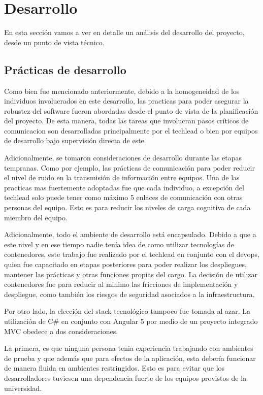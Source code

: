 \section{Desarrollo}

En esta sección vamos a ver en detalle un análisis del desarrollo del proyecto, desde un punto de vista técnico.

\subsection{Prácticas de desarrollo}

Como bien fue mencionado anteriormente, debido a la homogeneidad de los individuos involucrados en este desarrollo, las practicas para poder asegurar la robustez del software fueron abordadas desde el punto de vista de la planificación del proyecto. De esta manera, todas las tareas que involucran pasos críticos de comunicacion son desarrolladas principalmente por el techlead o bien por equipos de desarrollo bajo supervisión directa de este.

Adicionalmente, se tomaron consideraciones de desarrollo durante las etapas tempranas. Como por ejemplo, las prácticas de comunicación para poder reducir el nivel de ruido en la transmisión de información entre equipos. Una de las practicas mas fuertemente adoptadas fue que cada individuo, a excepción del techlead solo puede tener como máximo 5 enlaces de comunicación con otras personas del equipo. Esto es para reducir los niveles de carga cognitiva de cada miembro del equipo.

Adicionalmente, todo el ambiente de desarrollo está encapsulado. Debido a que a este nivel y en ese tiempo nadie tenía idea de como utilizar tecnologías de contenedores, este trabajo fue realizado por el techlead en conjunto con el devops, quien fue capacitado en etapas posteriores para poder realizar los despliegues, mantener las prácticas y otras funciones propias del cargo. La decisión de utilizar contenedores fue para reducir al minimo las fricciones de implementación y despliegue, como también los riesgos de seguridad asociados a la infraestructura.

Por otro lado, la elección del stack tecnológico tampoco fue tomada al azar. La utilización de C\# en conjunto con Angular 5 por medio de un proyecto integrado MVC obedece a dos consideraciones. 

La primera, es que ninguna persona tenia experiencia trabajando con ambientes de prueba y que además que para efectos de la aplicación, esta debería funcionar de manera fluida en ambientes restringidos. Esto es para evitar que los desarrolladores tuviesen una dependencia fuerte de los equipos provistos de la universidad.

